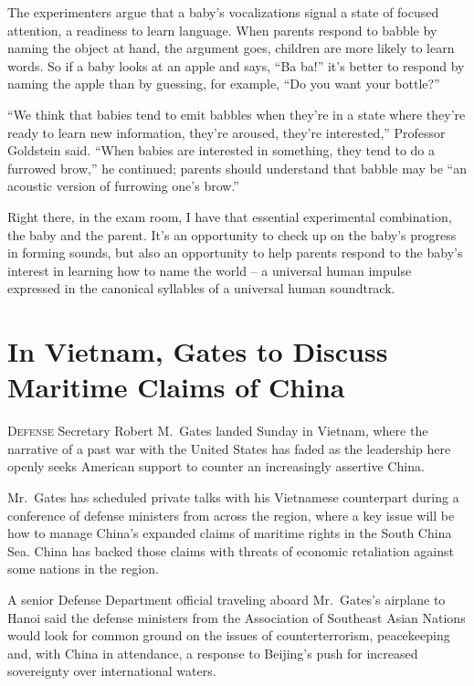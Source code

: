 ﻿\documentclass[12pt]{article}
\begin{document}
The experimenters argue that a baby's vocalizations signal a state of focused attention, a readiness
to learn language. When parents respond to babble by naming the object at hand, the argument goes,
children are more likely to learn words. So if a baby looks at an apple and says, ``Ba ba!'' it's
better to respond by naming the apple than by guessing, for example, ``Do you want your bottle?''

``We think that babies tend to emit babbles when they're in a state where they're ready to learn new
information, they're aroused, they're interested,'' Professor Goldstein said. ``When babies are
interested in something, they tend to do a furrowed brow,'' he continued; parents should understand
that babble may be ``an acoustic version of furrowing one's brow.''

Right there, in the exam room, I have that essential experimental combination, the baby and the
parent. It's an opportunity to check up on the baby's progress in forming sounds, but also an
opportunity to help parents respond to the baby's interest in learning how to name the world -- a
universal human impulse expressed in the canonical syllables of a universal human soundtrack.

\section{In Vietnam, Gates to Discuss Maritime Claims of China}

\lettrine{D}{efense} Secretary Robert M.~Gates landed Sunday in Vietnam,
where the narrative of a past war with the United States has faded as the leadership here openly
seeks American support to counter an increasingly assertive China.

Mr.~Gates has scheduled private talks with his Vietnamese counterpart during a conference of defense
ministers from across the region, where a key issue will be how to manage China's expanded claims of
maritime rights in the South China Sea. China has backed those claims with threats of economic
retaliation against some nations in the region.

A senior Defense Department official traveling aboard Mr.~Gates's airplane to Hanoi said the defense
ministers from the Association of Southeast Asian Nations would look for common ground on the issues
of counterterrorism, peacekeeping and, with China in attendance, a response to Beijing's push for
increased sovereignty over international waters.
\end{document}

